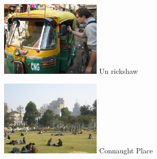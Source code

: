 \begin{multicols}{2}
\hspace*{-0.65cm}
\includegraphics[width=4.8cm]{articles/Des-indiens-dans-la-ville/ricksaw.jpg}
Un rickshaw

\hspace*{-0.65cm}
\includegraphics[width=4.8cm]{articles/Des-indiens-dans-la-ville/connaughtplace.jpg}
Connaught Place

\end{multicols}
